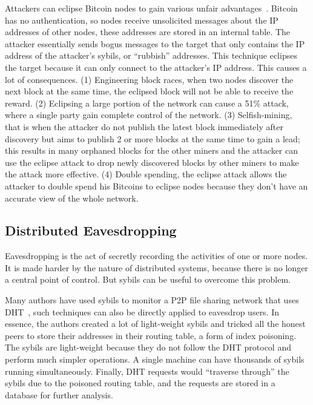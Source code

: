 Attackers can eclipse Bitcoin nodes to gain various unfair
advantages~\cite{heilman2015eclipse}. Bitcoin has no authentication, so nodes
receive unsolicited messages about the IP addresses of other nodes, these
addresses are stored in an internal table. The attacker essentially sends bogus
messages to the target that only contains the IP address of the attacker's
sybils, or ``rubbish'' addresses. This technique eclipses the target because it
can only connect to the attacker's IP address. This causes a lot of
consequences. (1) Engineering block races, when two nodes discover the next
block at the same time, the eclipsed block will not be able to receive the
reward. (2) Eclipsing a large portion of the network can cause a 51\% attack,
where a single party gain complete control of the network. (3) Selfish-mining,
that is when the attacker do not publish the latest block immediately after
discovery but aims to publish 2 or more blocks at the same time to gain a lead;
this results in many orphaned blocks for the other miners and the attacker can
use the eclipse attack to drop newly discovered blocks by other miners to make
the attack more effective. (4) Double spending, the eclipse attack allows the
attacker to double spend his Bitcoins to eclipse nodes because they don't have
an accurate view of the whole network.

\subsection{Distributed Eavesdropping}
Eavesdropping is the act of secretly recording the activities of one or more
nodes. It is made harder by the nature of distributed systems, because there is
no longer a central point of control. But sybils can be useful to overcome this
problem.

Many authors have used sybils to monitor a P2P file sharing network that uses
DHT~\cite{holz2008measurements, steiner2007exploiting}, such techniques can also
be directly applied to eavesdrop users. In essence, the authors created a lot of
light-weight sybils and tricked all the honest peers to store their addresses in
their routing table, a form of index poisoning. The sybils are light-weight
because they do not follow the DHT protocol and perform much simpler operations.
A single machine can have thousands of sybils running simultaneously. Finally,
DHT requests would ``traverse through'' the sybils due to the poisoned routing
table, and the requests are stored in a database for further analysis.

